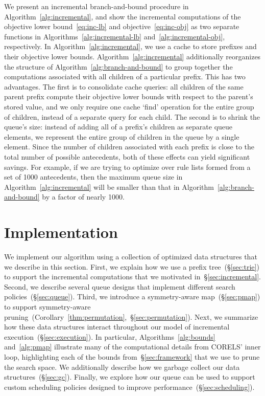 \documentclass[twoside,11pt]{article}
\begin{document}
\begin{arxiv}
We present an incremental branch-and-bound procedure in
Algorithm~\ref{alg:incremental}, and show the incremental computations
of the objective lower bound~\eqref{eq:inc-lb} and objective~\eqref{eq:inc-obj}
as two separate functions in Algorithms~\ref{alg:incremental-lb}
and~\ref{alg:incremental-obj}, respectively.
%
In Algorithm~\ref{alg:incremental}, we use a cache to store
prefixes and their objective lower bounds.
%
Algorithm~\ref{alg:incremental} additionally reorganizes the structure
of Algorithm~\ref{alg:branch-and-bound} to group together the computations
associated with all children of a particular prefix.
%
This has two advantages.
%
The first is to consolidate cache queries: all children of the same
parent prefix compute their objective lower bounds with respect to
the parent's stored value, and we only require one cache `find' operation
for the entire group of children, instead of a separate query for each child.
%
The second is to shrink the queue's size:
instead of adding all of a prefix's children as separate queue elements,
we represent the entire group of children in the queue by a single element.
%
Since the number of children associated with each prefix
is close to the total number of possible antecedents,
both of these effects can yield significant savings.
%
For example, if we are trying to optimize over rule lists formed
from a set of 1000 antecedents, then the maximum queue size in
Algorithm~\ref{alg:incremental} will be smaller than that in
Algorithm~\ref{alg:branch-and-bound} by a factor of nearly 1000.

\end{arxiv}

\clearpage
\section{Implementation}
\label{sec:implementation}

We implement our algorithm using a collection of optimized data structures
that we describe in this section.
%
First, we explain how we use a prefix tree~(\S\ref{sec:trie})
to support the incremental computations that we motivated in~\S\ref{sec:incremental}.
%
Second, we describe several queue designs
that implement different search policies~(\S\ref{sec:queue}).
%
Third, we introduce a symmetry-aware map~(\S\ref{sec:pmap}) to support
symmetry-aware pruning~(Corollary~\ref{thm:permutation},~\S\ref{sec:permutation}).
%
Next, we summarize how these data structures interact throughout
our model of incremental execution~(\S\ref{sec:execution}).
%
In particular, Algorithms~\ref{alg:bounds} and~\ref{alg:pmap} illustrate many
of the computational details from CORELS' inner loop, highlighting each of
the bounds from~\S\ref{sec:framework} that we use to prune the search space.
%
We additionally describe how we garbage collect our data structures~(\S\ref{sec:gc}).
%
Finally, we explore how our queue can be used to support
custom scheduling policies designed to improve performance~(\S\ref{sec:scheduling}).
\end{document}
